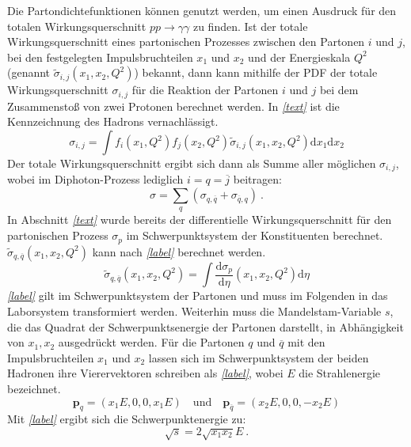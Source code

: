 Die Partondichtefunktionen können genutzt werden, um einen Ausdruck für den totalen Wirkungsquerschnitt $pp \rightarrow \gamma \gamma $ zu finden. Ist der totale Wirkungsquerschnitt eines partonischen Prozesses zwischen den Partonen $i$ und $j$, bei den festgelegten Impulsbruchteilen $x_1$ und $x_2$ und der Energieskala $Q^2$ (genannt $\tilde{\sigma}_{i,j}(x_1, x_2, Q^2)$) bekannt, dann kann mithilfe der PDF der totale Wirkungsquerschnitt $\sigma_{i,j}$ für die Reaktion der Partonen $i$ und $j$ bei dem Zusammenstoß von zwei Protonen berechnet werden. In \textit{\autoref{text}} ist die Kennzeichnung des Hadrons vernachlässigt.  
\begin{equation}
\sigma_{i,j} = \int f_i(x_1, Q^2)f_j(x_2, Q^2) \tilde{\sigma}_{i,j}(x_1, x_2, Q^2)\text{d}x_1\text{d}x_2
\end{equation}
Der totale Wirkungsquerschnitt ergibt sich dann als Summe aller möglichen $\sigma_{i,j}$, wobei im Diphoton-Prozess lediglich $i=q=\overline{j}$ beitragen:  
\begin{equation}
\sigma = \sum_{q} \left(\sigma_{q,\overline{q}} + \sigma_{\overline{q},q} \right)~. 
\end{equation}
In Abschnitt \textit{\autoref{text}} wurde bereits der differentielle Wirkungsquerschnitt für den partonischen Prozess $\sigma_p$ im Schwerpunktsystem der Konstituenten berechnet. $\tilde{\sigma}_{q,\overline{q}}(x_1, x_2, Q^2)$ kann nach \textit{\autoref{label}} berechnet werden.
\begin{equation}
\tilde{\sigma}_{q,\overline{q}}(x_1, x_2, Q^2) = \int \frac{\text{d}\sigma_{p}}{\text{d}\eta}\left(x_1,x_2, Q^2\right)\text{d} \eta
\end{equation}
\textit{\autoref{label}} gilt im Schwerpunktsystem der Partonen und muss im Folgenden in das Laborsystem transformiert werden. Weiterhin muss die Mandelstam-Variable $s$, die das Quadrat der Schwerpunktsenergie der Partonen darstellt, in Abhängigkeit von $x_1, x_2$ ausgedrückt werden. Für die Partonen $q$ und $\overline{q}$ mit den Impulsbruchteilen $x_1$ und $x_2$ lassen sich im Schwerpunktsystem der beiden Hadronen ihre Vierervektoren schreiben als \textit{\autoref{label}}, wobei $E$ die Strahlenergie bezeichnet.
\begin{equation}
\textbf{p}_q = \left(x_1E, 0, 0, x_1E\right) \quad \text{und} \quad \textbf{p}_{\overline{q}} = \left(x_2E, 0, 0, -x_2E\right)
\end{equation}
Mit \textit{\autoref{label}} ergibt sich die Schwerpunktenergie zu:
\begin{equation}
\sqrt{s} = 2\sqrt{x_1x_2}E~.
\end{equation}
